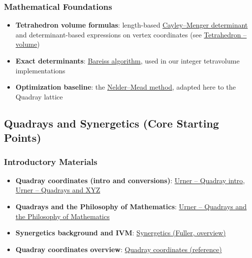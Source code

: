 \documentclass[
  10pt,
]{article}
\providecommand{\tightlist}{%
  \setlength{\itemsep}{0pt}\setlength{\parskip}{0pt}}
\begin{document}
\subsubsection{Mathematical Foundations}\label{mathematical-foundations}

\begin{itemize}
\tightlist
\item
  \textbf{Tetrahedron volume formulas}: length-based
  \href{https://en.wikipedia.org/wiki/Cayley\%E2\%80\%93Menger_determinant}{Cayley--Menger
  determinant} and determinant-based expressions on vertex coordinates
  (see
  \href{https://en.wikipedia.org/wiki/Tetrahedron\#Volume}{Tetrahedron
  -- volume})
\item
  \textbf{Exact determinants}:
  \href{https://en.wikipedia.org/wiki/Bareiss_algorithm}{Bareiss
  algorithm}, used in our integer tetravolume implementations
\item
  \textbf{Optimization baseline}: the
  \href{https://en.wikipedia.org/wiki/Nelder\%E2\%80\%93Mead_method}{Nelder--Mead
  method}, adapted here to the Quadray lattice
\end{itemize}

\subsection{Quadrays and Synergetics (Core Starting
Points)}\label{quadrays-and-synergetics-core-starting-points}

\subsubsection{Introductory Materials}\label{introductory-materials}

\begin{itemize}
\tightlist
\item
  \textbf{Quadray coordinates (intro and conversions)}:
  \href{https://www.grunch.net/synergetics/quadintro.html}{Urner --
  Quadray intro},
  \href{https://www.grunch.net/synergetics/quadxyz.html}{Urner --
  Quadrays and XYZ}
\item
  \textbf{Quadrays and the Philosophy of Mathematics}:
  \href{https://www.grunch.net/synergetics/quadphil.html}{Urner --
  Quadrays and the Philosophy of Mathematics}
\item
  \textbf{Synergetics background and IVM}:
  \href{https://en.wikipedia.org/wiki/Synergetics_(Fuller)}{Synergetics
  (Fuller, overview)}
\item
  \textbf{Quadray coordinates overview}:
  \href{https://en.wikipedia.org/wiki/Quadray_coordinates}{Quadray
  coordinates (reference)}
\end{itemize}
\end{document}
